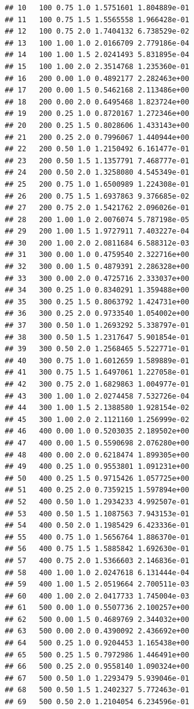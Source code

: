 \documentclass[11pt,a4paper]{article}
\begin{document}
\begin{verbatim}
## 10   100 0.75 1.0 1.5751601 1.804889e-01
## 11   100 0.75 1.5 1.5565558 1.966428e-01
## 12   100 0.75 2.0 1.7404132 6.738529e-02
## 13   100 1.00 1.0 2.0166709 2.779186e-04
## 14   100 1.00 1.5 2.0241493 5.831895e-04
## 15   100 1.00 2.0 2.3514768 1.235360e-01
## 16   200 0.00 1.0 0.4892177 2.282463e+00
## 17   200 0.00 1.5 0.5462168 2.113486e+00
## 18   200 0.00 2.0 0.6495468 1.823724e+00
## 19   200 0.25 1.0 0.8720167 1.272346e+00
## 20   200 0.25 1.5 0.8028606 1.433143e+00
## 21   200 0.25 2.0 0.7996067 1.440944e+00
## 22   200 0.50 1.0 1.2150492 6.161477e-01
## 23   200 0.50 1.5 1.1357791 7.468777e-01
## 24   200 0.50 2.0 1.3258080 4.545349e-01
## 25   200 0.75 1.0 1.6500989 1.224308e-01
## 26   200 0.75 1.5 1.6937863 9.376685e-02
## 27   200 0.75 2.0 1.5421762 2.096026e-01
## 28   200 1.00 1.0 2.0076074 5.787198e-05
## 29   200 1.00 1.5 1.9727911 7.403227e-04
## 30   200 1.00 2.0 2.0811684 6.588312e-03
## 31   300 0.00 1.0 0.4759540 2.322716e+00
## 32   300 0.00 1.5 0.4879391 2.286328e+00
## 33   300 0.00 2.0 0.4725716 2.333037e+00
## 34   300 0.25 1.0 0.8340291 1.359488e+00
## 35   300 0.25 1.5 0.8063792 1.424731e+00
## 36   300 0.25 2.0 0.9733540 1.054002e+00
## 37   300 0.50 1.0 1.2693292 5.338797e-01
## 38   300 0.50 1.5 1.2317647 5.901854e-01
## 39   300 0.50 2.0 1.2568465 5.522771e-01
## 40   300 0.75 1.0 1.6012659 1.589889e-01
## 41   300 0.75 1.5 1.6497061 1.227058e-01
## 42   300 0.75 2.0 1.6829863 1.004977e-01
## 43   300 1.00 1.0 2.0274458 7.532726e-04
## 44   300 1.00 1.5 2.1388580 1.928154e-02
## 45   300 1.00 2.0 2.1121160 1.256999e-02
## 46   400 0.00 1.0 0.5203035 2.189502e+00
## 47   400 0.00 1.5 0.5590698 2.076280e+00
## 48   400 0.00 2.0 0.6218474 1.899305e+00
## 49   400 0.25 1.0 0.9553801 1.091231e+00
## 50   400 0.25 1.5 0.9715426 1.057725e+00
## 51   400 0.25 2.0 0.7359215 1.597894e+00
## 52   400 0.50 1.0 1.2934233 4.992507e-01
## 53   400 0.50 1.5 1.1087563 7.943153e-01
## 54   400 0.50 2.0 1.1985429 6.423336e-01
## 55   400 0.75 1.0 1.5656764 1.886370e-01
## 56   400 0.75 1.5 1.5885842 1.692630e-01
## 57   400 0.75 2.0 1.5366603 2.146836e-01
## 58   400 1.00 1.0 2.0247618 6.131444e-04
## 59   400 1.00 1.5 2.0519664 2.700511e-03
## 60   400 1.00 2.0 2.0417733 1.745004e-03
## 61   500 0.00 1.0 0.5507736 2.100257e+00
## 62   500 0.00 1.5 0.4689769 2.344032e+00
## 63   500 0.00 2.0 0.4390092 2.436692e+00
## 64   500 0.25 1.0 0.9204453 1.165438e+00
## 65   500 0.25 1.5 0.7972986 1.446491e+00
## 66   500 0.25 2.0 0.9558140 1.090324e+00
## 67   500 0.50 1.0 1.2293479 5.939046e-01
## 68   500 0.50 1.5 1.2402327 5.772463e-01
## 69   500 0.50 2.0 1.2104054 6.234596e-01

\end{verbatim}
\end{document}
